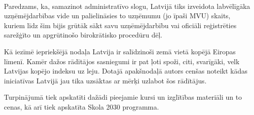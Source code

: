 \paragraph{}
Paredzams, ka, samazinot administratīvo slogu, Latvijā tiks izveidota labvēlīgāka
uzņēmējdarbības vide un palielināsies to uzņēmumu (jo īpaši MVU) skaits, kuriem līdz šim
bijis grūtāk sākt savu uzņēmējdarbību vai oficiāli reģistrēties sarežģīto un apgrūtinošo
birokrātisko procedūru dēļ.
\par
Kā iezīmē iepriekšējā nodaļa Latvija ir salīdzinoši zemā vietā kopējā Eiropas līmenī.
Kamēr dažos rādītājos sasniegumi ir pat ļoti spoži, citi, svarīgāki, velk Latvijas kopējo
indeksu uz leju. Dotajā apakšnodaļā autors cenšas noteikt kādas iniciatīvas Latvijā jau
tika uzsāktas ar mērķi uzlabot šos rādītājus.
\par
Turpinājumā tiek apskatīti dažādi pieejamie kursi un izglītības materiāli un to cenas,
kā arī tiek apskatīta Skola 2030 programma.